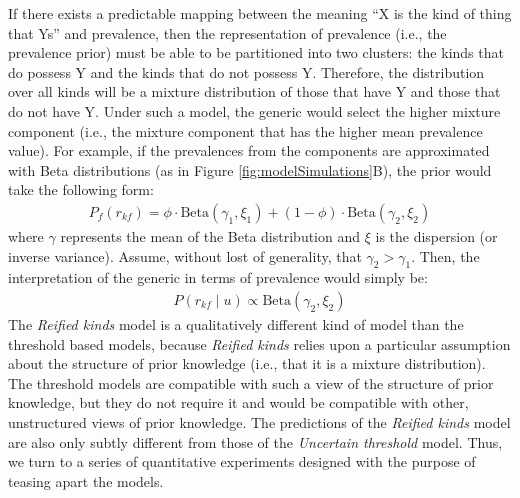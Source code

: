 \documentclass[floatsintext,doc]{apa6}
\begin{document}
If there exists a predictable mapping between the meaning ``X is the kind of thing that Ys'' and prevalence, then the representation of prevalence (i.e., the prevalence prior) must be able to be partitioned into two clusters: the kinds that do possess Y and the kinds that do not possess Y. 
Therefore, the distribution over all kinds will be a mixture distribution of those that have Y and those that do not have Y. 
Under such a model, the generic would select the higher mixture component (i.e., the mixture component that has the higher mean prevalence value).
For example, if the prevalences from the components are approximated with Beta distributions (as in Figure \ref{fig:modelSimulations}B), the prior would take the following form:
\begin{eqnarray}
P_f(r_{kf}) = \phi \cdot \text{Beta}(\gamma_1, \xi_1) + (1-\phi)\cdot \text{Beta}(\gamma_2, \xi_2)
\end{eqnarray}
\noindent where $\gamma$ represents the mean of the Beta distribution and $\xi$ is the dispersion (or inverse variance).
Assume, without lost of generality, that $\gamma_2 > \gamma_1$. Then, the interpretation of the generic in terms of prevalence would simply be:
%
\begin{eqnarray}
P (r_{kf} \mid u) \propto  \text{Beta}(\gamma_2, \xi_2) \label{eq:rk}
\end{eqnarray}
%
The \emph{Reified kinds} model is a qualitatively different kind of model than the threshold based models, because \emph{Reified kinds} relies upon a particular assumption about the structure of prior knowledge (i.e., that it is a mixture distribution). The threshold models are compatible with such a view of the structure of prior knowledge, but they do not require it and would be compatible with other, unstructured views of prior knowledge. 
The predictions of the \emph{Reified kinds} model are also only subtly different from those of the \emph{Uncertain threshold} model. 
Thus, we turn to a series of quantitative experiments designed with the purpose of teasing apart the models. 
\end{document}
